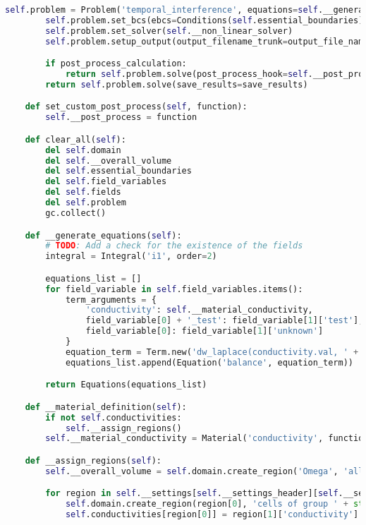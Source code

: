 \begin{lstlisting}[language=Python,caption={Class interfacing to SfePy and contains routines for the PHM and spherical model \gls{FEM} solution.},captionpos=b,label=lst:fem_solver_class]
        self.problem = Problem('temporal_interference', equations=self.__generate_equations())
        self.problem.set_bcs(ebcs=Conditions(self.essential_boundaries))
        self.problem.set_solver(self.__non_linear_solver)
        self.problem.setup_output(output_filename_trunk=output_file_name, output_dir=output_dir)

        if post_process_calculation:
            return self.problem.solve(post_process_hook=self.__post_process, save_results=save_results)
        return self.problem.solve(save_results=save_results)

    def set_custom_post_process(self, function):
        self.__post_process = function

    def clear_all(self):
        del self.domain
        del self.__overall_volume
        del self.essential_boundaries
        del self.field_variables
        del self.fields
        del self.problem
        gc.collect()

    def __generate_equations(self):
        # TODO: Add a check for the existence of the fields
        integral = Integral('i1', order=2)

        equations_list = []
        for field_variable in self.field_variables.items():
            term_arguments = {
                'conductivity': self.__material_conductivity,
                field_variable[0] + '_test': field_variable[1]['test'],
                field_variable[0]: field_variable[1]['unknown']
            }
            equation_term = Term.new('dw_laplace(conductivity.val, ' + field_variable[0] + '_test, ' + field_variable[0] + ')', integral, self.__overall_volume, **term_arguments)
            equations_list.append(Equation('balance', equation_term))

        return Equations(equations_list)

    def __material_definition(self):
        if not self.conductivities:
            self.__assign_regions()
        self.__material_conductivity = Material('conductivity', function=Function('get_conductivity', lambda ts, coors, mode=None, equations=None, term=None, problem=None, **kwargs: self.__get_conductivity(ts, coors, mode, equations, term, problem, conductivities=self.conductivities)))

    def __assign_regions(self):
        self.__overall_volume = self.domain.create_region('Omega', 'all')

        for region in self.__settings[self.__settings_header][self.__selected_model]['regions'].items():
            self.domain.create_region(region[0], 'cells of group ' + str(region[1]['id']))
            self.conductivities[region[0]] = region[1]['conductivity']


\end{lstlisting}
